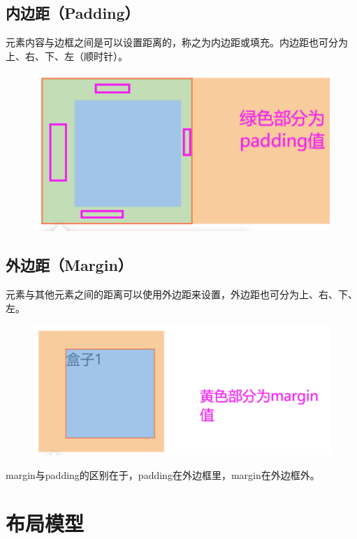 \subsection{内边距（Padding）}

元素内容与边框之间是可以设置距离的，称之为内边距或填充。内边距也可分为上、右、下、左（顺时针）。

\begin{figure}[H]
    \centering
    \includegraphics[scale=0.7]{img/C8/8-2/3.png}
\end{figure}

\subsection{外边距（Margin）}

元素与其他元素之间的距离可以使用外边距来设置，外边距也可分为上、右、下、左。

\begin{figure}[H]
    \centering
    \includegraphics[scale=0.7]{img/C8/8-2/4.png}
\end{figure}

margin与padding的区别在于，padding在外边框里，margin在外边框外。

\newpage

\section{布局模型}

